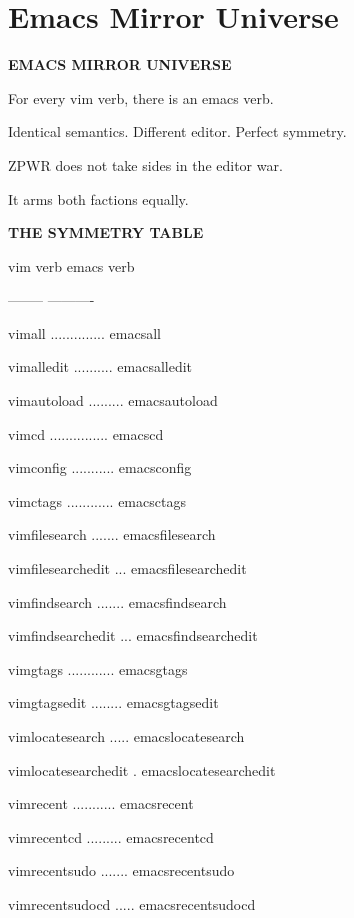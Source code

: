 \documentclass[11pt,a4paper,twoside]{book}
\begin{document}
\section{Emacs Mirror Universe}


\vspace{10pt}
{\large\bfseries\color{neoncyan} EMACS MIRROR UNIVERSE}\vspace{6pt}

\begin{codebox}
For every vim verb, there is an emacs verb.\\
\end{codebox}

Identical semantics. Different editor. Perfect symmetry.

ZPWR does not take sides in the editor war.

It arms both factions equally.


\vspace{12pt}
{\bfseries\color{neonyellow} THE SYMMETRY TABLE}\vspace{4pt}

vim verb              emacs verb

--------              ----------

vimall .............. emacsall

vimalledit .......... emacsalledit

vimautoload ......... emacsautoload

vimcd ............... emacscd

vimconfig ........... emacsconfig

vimctags ............ emacsctags

vimfilesearch ....... emacsfilesearch

vimfilesearchedit ... emacsfilesearchedit

vimfindsearch ....... emacsfindsearch

vimfindsearchedit ... emacsfindsearchedit

vimgtags ............ emacsgtags

vimgtagsedit ........ emacsgtagsedit

vimlocatesearch ..... emacslocatesearch

vimlocatesearchedit . emacslocatesearchedit

vimrecent ........... emacsrecent

vimrecentcd ......... emacsrecentcd

vimrecentsudo ....... emacsrecentsudo

vimrecentsudocd ..... emacsrecentsudocd
\end{document}
